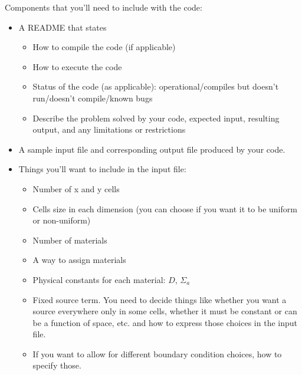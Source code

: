 \documentclass[12pt]{article}
\begin{document}
Components that you'll need to include with the code:
\begin{itemize}
\item A README that states
  \begin{itemize}
  \item How to compile the code (if applicable)
  \item How to execute the code
  \item Status of the code (as applicable): operational/compiles but doesn't run/doesn't compile/known bugs
  \item Describe the problem solved by your code, expected input, resulting output, and any limitations or restrictions
  \end{itemize}
  
\item A sample input file and corresponding output file produced by your code.

\item Things you'll want to include in the input file:
  \begin{itemize}
  \item Number of x and y cells
  \item Cells size in each dimension (you can choose if you want it to be uniform or non-uniform)
  \item Number of materials
  \item A way to assign materials
  \item Physical constants for each material: $D$, $\Sigma_a$
  \item Fixed source term. You need to decide things like whether you want a source everywhere only in some cells, whether it must be constant or can be a function of space, etc. and how to express those choices in the input file.
  \item If you want to allow for different boundary condition choices, how to specify those.
  \end{itemize}
  
\end{itemize}
\end{document}
